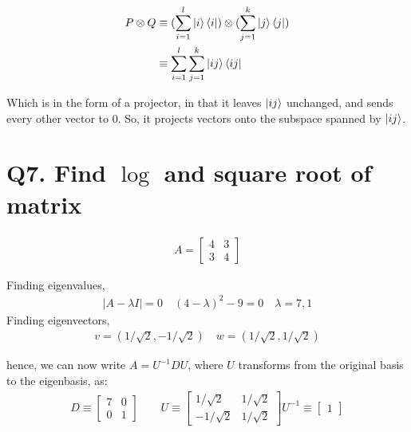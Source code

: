 \documentclass[11pt]{book}
\begin{document}
\begin{align*}
    P \otimes Q &\equiv (\sum_{i=1}^l \ket{i}\bra{i}) \otimes (\sum_{j=1}^k \ket{j}\bra{j}) \\
                &\equiv \sum_{i=1}^l \sum_{j=1}^k \ket{ij}\bra{ij} \\
\end{align*}

Which is in the form of a projector, in that it leaves $\ket{ij}$ unchanged,
and sends every other vector to $0$. So, it projects vectors onto the
subspace spanned by $\ket{ij}$.


\section{Q7. Find $\log$ and square root of matrix}
\begin{align*}
A = \begin{bmatrix}
    4 & 3 \\
    3 & 4
\end{bmatrix}
\end{align*}

Finding eigenvalues,
\begin{align*}
    |A - \lambda I| = 0 \quad (4 - \lambda)^2 - 9 = 0 \quad \lambda = 7, 1
\end{align*}
Finding eigenvectors,
\begin{align*}
    v = (1/\sqrt 2, -1/\sqrt 2) \quad w = (1/\sqrt 2, 1/\sqrt 2)
\end{align*}

hence, we can now write $A = U^{-1} D U$, where $U$ transforms
from the original basis to the eigenbasis, as:
\begin{align*}
    D \equiv \begin{bmatrix} 7 & 0 \\ 0 & 1 \end{bmatrix} \qquad
    U \equiv \begin{bmatrix} 
        1/\sqrt 2 & 1/\sqrt 2 \\
        -1/\sqrt 2 & 1/\sqrt 2
    \end{bmatrix}
    U^{-1} \equiv \begin{bmatrix} 1
    \end{bmatrix}
\end{align*}
\end{document}
